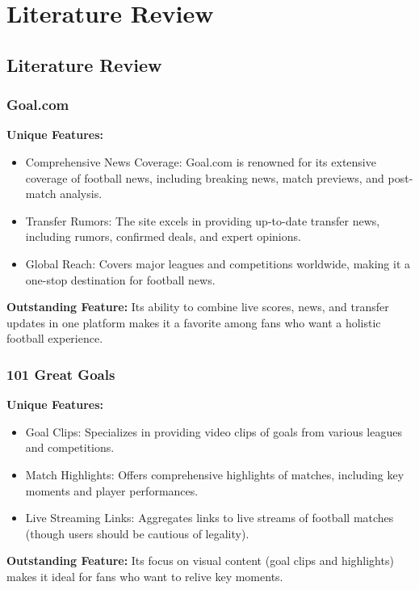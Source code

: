 \chapter{Literature Review}
\label{chap:literature-review}


\section{Literature Review}

\subsection{Goal.com}
\textbf{Unique Features:}
\begin{itemize}
    \item Comprehensive News Coverage: Goal.com is renowned for its extensive coverage of football news, including breaking news, match previews, and post-match analysis.
    \item Transfer Rumors: The site excels in providing up-to-date transfer news, including rumors, confirmed deals, and expert opinions.
    \item Global Reach: Covers major leagues and competitions worldwide, making it a one-stop destination for football news.
\end{itemize}
\textbf{Outstanding Feature:} Its ability to combine live scores, news, and transfer updates in one platform makes it a favorite among fans who want a holistic football experience.

\subsection{101 Great Goals}
\textbf{Unique Features:}
\begin{itemize}
    \item Goal Clips: Specializes in providing video clips of goals from various leagues and competitions.
    \item Match Highlights: Offers comprehensive highlights of matches, including key moments and player performances.
    \item Live Streaming Links: Aggregates links to live streams of football matches (though users should be cautious of legality).
\end{itemize}
\textbf{Outstanding Feature:} Its focus on visual content (goal clips and highlights) makes it ideal for fans who want to relive key moments.

